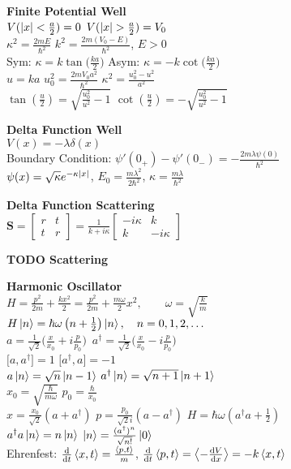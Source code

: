 \documentclass[11pt, a4paper]{article}
\newcommand{\newsec}[1]{\vspace{2mm}\textbf{#1}\\}
\newcommand{\mat}[1]{\mathbf{#1}} %
\begin{document}
\begin{multicols}{2}
\newsec{Finite Potential Well}
$ V(\abs{x} < \frac{a}{2}) = 0 $ \qquad $ V(\abs{x} > \frac{a}{2}) = V_{0} $\\
$ \kappa^{2} = \frac{2mE}{\hbar^{2}} $ \qquad $ k^{2} = \frac{2m(V_{0} - E)}{\hbar^{2}} $, \quad $ E > 0 $\\
Sym: $ \kappa = k \tan \big(\frac{ka}{2}\big) $ \qquad Asym: $ \kappa = -k \cot \big(\frac{ka}{2}\big) $\\
$ u = ka $ \qquad $ u_{0}^{2} = \frac{2mV_{0}a^{2}}{\hbar^{2}} $ \qquad $ \kappa^{2} = \frac{u_{0}^{2} - u^{2}}{a^{2}} $\\
$ \tan(\frac{u}{2}) = \sqrt{\frac{u_{0}^{2}}{u^{2}} - 1} $ \qquad $ \cot(\frac{u}{2}) = -\sqrt{\frac{u_{0}^{2}}{u^{2}} - 1} $



\newsec{Delta Function Well}
$ V(x) = -\lambda \delta (x) $\\
Boundary Condition: $ \psi'(0_{+}) - \psi'(0_{-}) = -\frac{2m\lambda\psi(0)}{\hbar^{2}} $\\
$ \psi(x) = \sqrt{\kappa} e^{-\kappa \abs{x}} $, \quad $ E_{0} = \frac{m\lambda^{2}}{2\hbar^{2}} $, \quad $ \kappa = \frac{m\lambda}{\hbar^{2}} $


\newsec{Delta Function Scattering}
 $ \mat{S} = 
\begin{bmatrix}
	r & t\\
	t & r
\end{bmatrix}
= 
\frac{1}{k + i \kappa}
\begin{bmatrix}
	-i\kappa & k\\
	k & -i \kappa
\end{bmatrix} $

\textbf{TODO Scattering}

\newsec{Harmonic Oscillator}
$ H = \frac{p^{2}}{2m} + \frac{kx^{2}}{2} = \frac{p^{2}}{2m} + \frac{m\omega}{2}x^{2}, \qquad \omega = \sqrt{\frac{k}{m}} $\\
$ H \ket{n} = \hbar \omega \left(n + \frac{1}{2}\right)\ket{n}, \quad n = 0, 1, 2, \ldots $\\
$ a = \frac{1}{\sqrt{2}}\big(\frac{x}{x_{0}} + i\frac{p}{p_{0}}\big) $ \qquad  $\, a^{\dagger} = \frac{1}{\sqrt{2}}\big(\frac{x}{x_{0}} - i\frac{p}{p_{0}}\big) $\\
$ \big[a, a^{\dagger}\big] = 1 $ \qquad \qquad  \quad $ \big[ a^{\dagger}, a\big] = -1 $\\
$ a\ket{n} = \sqrt{n}\ket{n-1} $ \qquad $ a^{\dagger} \ket{n} = \sqrt{n + 1} \ket{n+1} $ \\
$ x_{0} = \sqrt{\frac{\hbar}{m\omega}} $ \qquad $ p_{0} = \frac{\hbar}{x_{0}} $\\
$ x = \frac{x_{0}}{\sqrt{2}}(a + a^{\dagger}) $ \quad $ p = \frac{p_{0}}{\sqrt{2}i}(a - a^{\dagger}) $ \quad $ H = \hbar \omega\left (a^{\dagger}a + \frac{1}{2}\right ) $\\
$ a^{\dagger}a \ket{n} = n \ket{n}$ \qquad $ \ket{n} = \frac{(a^{\dagger})^{n}}{\sqrt{n!}} \ket{0} $\\
Ehrenfest: $ \dv{t}\ev{x, t} = \frac{\ev{p, t}}{m} $,  $\dv{t}\ev{p, t} = \ev{-\dv{V}{x}} = -k\ev{x, t} $




\end{multicols}
\end{document}
